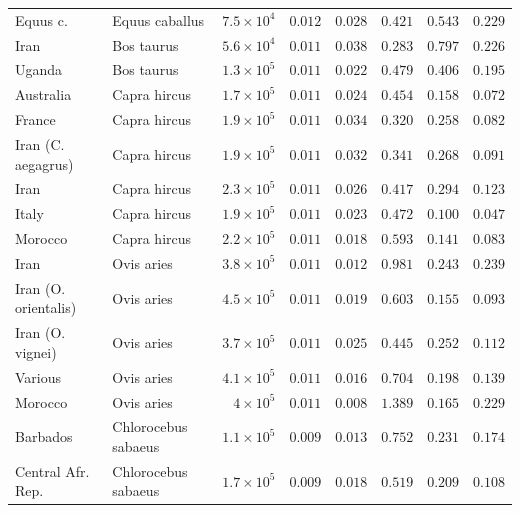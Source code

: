 \documentclass{article}
\begin{document}
\begin{center}
\begin{longtable*}{|l|l|r|r|r|r|r|r|}
            \bottomrule
            \endlastfoot
             Equus c. & Equus caballus & $7.5\times 10^{4}$ & $ 0.012$ & $ 0.028$ & $ 0.421$ & $ 0.543$ & $ 0.229$ \\
            Iran & Bos taurus & $5.6\times 10^{4}$ & $ 0.011$ & $ 0.038$ & $ 0.283$ & $ 0.797$ & $ 0.226$ \\
            Uganda & Bos taurus & $1.3\times 10^{5}$ & $ 0.011$ & $ 0.022$ & $ 0.479$ & $ 0.406$ & $ 0.195$ \\
             Australia & Capra hircus & $1.7\times 10^{5}$ & $ 0.011$ & $ 0.024$ & $ 0.454$ & $ 0.158$ & $ 0.072$ \\
             France & Capra hircus & $1.9\times 10^{5}$ & $ 0.011$ & $ 0.034$ & $ 0.320$ & $ 0.258$ & $ 0.082$ \\
             Iran (C. aegagrus) & Capra hircus & $1.9\times 10^{5}$ & $ 0.011$ & $ 0.032$ & $ 0.341$ & $ 0.268$ & $ 0.091$ \\
             Iran & Capra hircus & $2.3\times 10^{5}$ & $ 0.011$ & $ 0.026$ & $ 0.417$ & $ 0.294$ & $ 0.123$ \\
             Italy & Capra hircus & $1.9\times 10^{5}$ & $ 0.011$ & $ 0.023$ & $ 0.472$ & $ 0.100$ & $ 0.047$ \\
             Morocco & Capra hircus & $2.2\times 10^{5}$ & $ 0.011$ & $ 0.018$ & $ 0.593$ & $ 0.141$ & $ 0.083$ \\
            Iran & Ovis aries & $3.8\times 10^{5}$ & $ 0.011$ & $ 0.012$ & $ 0.981$ & $ 0.243$ & $ 0.239$ \\
            Iran (O. orientalis) & Ovis aries & $4.5\times 10^{5}$ & $ 0.011$ & $ 0.019$ & $ 0.603$ & $ 0.155$ & $ 0.093$ \\
            Iran (O. vignei) & Ovis aries & $3.7\times 10^{5}$ & $ 0.011$ & $ 0.025$ & $ 0.445$ & $ 0.252$ & $ 0.112$ \\
            Various & Ovis aries & $4.1\times 10^{5}$ & $ 0.011$ & $ 0.016$ & $ 0.704$ & $ 0.198$ & $ 0.139$ \\
            Morocco & Ovis aries & $ 4\times 10^{5}$ & $ 0.011$ & $ 0.008$ & $ 1.389$ & $ 0.165$ & $ 0.229$ \\
             Barbados & Chlorocebus sabaeus & $1.1\times 10^{5}$ & $ 0.009$ & $ 0.013$ & $ 0.752$ & $ 0.231$ & $ 0.174$ \\
             Central Afr. Rep. & Chlorocebus sabaeus & $1.7\times 10^{5}$ & $ 0.009$ & $ 0.018$ & $ 0.519$ & $ 0.209$ & $ 0.108$ \\

\end{longtable*}
\end{center}
\end{document}
